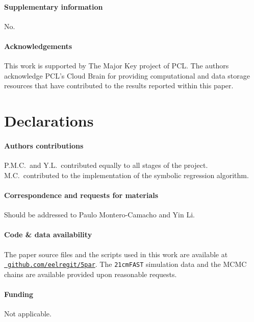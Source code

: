\paragraph{\large Supplementary information} No.

\paragraph{\large Acknowledgements}
This work is supported by The Major Key project of PCL.
The authors acknowledge PCL's Cloud Brain for providing computational
and data storage resources that have contributed to the results reported
within this paper.

\section*{Declarations}

\paragraph{\large Authors contributions}
P.M.C.\ and Y.L.\ contributed equally to all stages of the project.
M.C.\ contributed to the implementation of the symbolic regression
algorithm.

\vspace{-1em}
\paragraph{\large Correspondence and requests for materials}
Should be addressed to Paulo Montero-Camacho and Yin Li.

\vspace{-1em}
\paragraph{\large Code \& data availability}
The paper source files and the scripts used in this work are available
at \href{https://github.com/eelregit/5par}{\faGithub\
\texttt{github.com/eelregit/5par}}.
The \texttt{21cmFAST} simulation data and the MCMC chains are available
provided upon reasonable requests.

\vspace{-1em}
\paragraph{\large Funding}
Not applicable.

\vspace{-1em}
